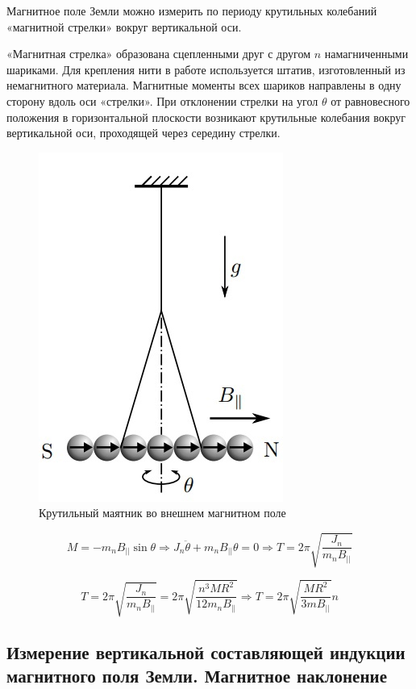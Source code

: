 \documentclass[a4paper, 12pt]{article}%
\begin{document}
Магнитное поле Земли можно измерить по периоду крутильных колебаний «магнитной стрелки» вокруг вертикальной оси.

«Магнитная стрелка» образована сцепленными друг с другом $n$ намагниченными шариками. Для крепления нити в работе используется штатив, изготовленный из немагнитного материала. Магнитные моменты всех шариков направлены в одну сторону вдоль оси «стрелки». При отклонении стрелки на угол $\theta$ от равновесного положения в горизонтальной плоскости возникают крутильные колебания вокруг вертикальной оси, проходящей через середину стрелки.

\begin{figure}[h]
    \centering
    \includegraphics[width = 6 cm]{2.jpg}
    \caption{ Крутильный маятник во внешнем магнитном поле}
    \label{sh1}
\end{figure}

\begin{equation}
    M = -m_n B_{||} \sin{\theta} \Rightarrow J_n \ddot{\theta} + m_n B_{||} \theta = 0 \Rightarrow T = 2 \pi \sqrt{\frac{J_n}{m_n B_{||}}}
\end{equation}

\begin{equation}
    T = 2 \pi \sqrt{\frac{J_n}{m_n B_{||}}} = 2 \pi \sqrt{\frac{n^3 M R^2}{12m_n B_{||}}} \Rightarrow T = 2 \pi \sqrt{\frac{M R^2}{3 m B_{||}}} n
\end{equation}

\subsection{Измерение вертикальной составляющей индукции магнитного поля Земли. Магнитное наклонение}
\end{document}
